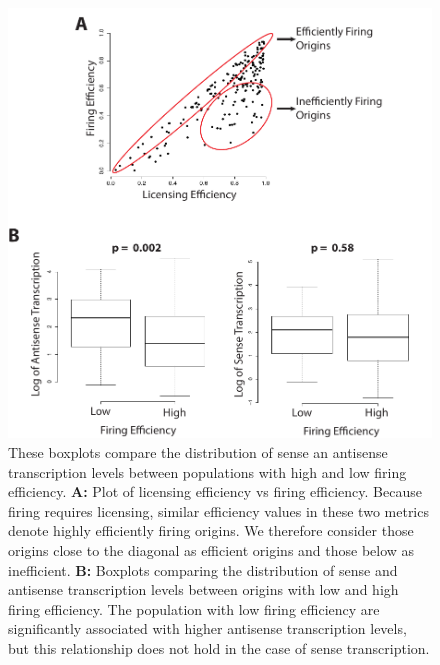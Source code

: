 \begin{figure}[h!]

\centering
\includegraphics[width=\textwidth]{figures/results/firing}
\caption[boxplots comparing transcription levels in high- and low-firing populations]{These boxplots compare the distribution of sense an antisense transcription levels between populations with high and low firing efficiency. \textbf{A: }Plot of licensing efficiency vs firing efficiency. Because firing requires licensing, similar efficiency values in these two metrics denote highly efficiently firing origins. We therefore consider those origins close to the diagonal as efficient origins and those below as inefficient. \textbf{B: } Boxplots comparing the distribution of sense and antisense transcription levels between origins with low and high firing efficiency. The population with low firing efficiency are significantly associated with higher antisense transcription levels, but this relationship does not hold in the case of sense transcription. }
\label{fig:firing}

\end{figure} 


